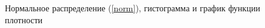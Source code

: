 \documentclass[12pt,a4paper]{article}
\begin{document}
{\begin{figure}[h!]
\begin{minipage}[h]{0.3\linewidth}
			\end{minipage}
			\hfill
			\begin{minipage}[h]{0.3\linewidth}
			\end{minipage}
			\caption{Нормальное распределение (\ref{norm}), гистограмма и график функции плотности}
			\label{ris:normal}
		\end{figure}
	}
	
\end{document}

